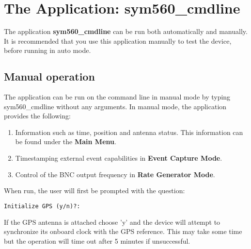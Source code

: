 \documentclass[11pt]{article}
\begin{document}




    \section{The Application: sym560\_cmdline} \label{application}
    The application \textbf{sym560\_cmdline} can be run both automatically and manually. It is recommended that you use this application manually to test the device, before running in auto mode.


    \subsection{Manual operation} \label{manualapp}
    The application can be run on the command line in manual mode by typing sym560\_cmdline without any arguments. In manual mode, the application provides the following:
    \begin{enumerate}
        \item Information such as time, position and antenna status. This information can be found under the \textbf{Main Menu}.
        \item Timestamping external event capabilities in \textbf{Event Capture Mode}.
        \item Control of the BNC output frequency in \textbf{Rate Generator Mode}.
    \end{enumerate}

    \noindent When run, the user will first be prompted with the question:
    \begin{verbatim}
Initialize GPS (y/n)?:
    \end{verbatim}
    If the GPS antenna is attached choose 'y' and the device will attempt to synchronize its onboard clock with the GPS reference. This may take some time but the operation will time out after 5 minutes if unsuccessful.


\end{document}
